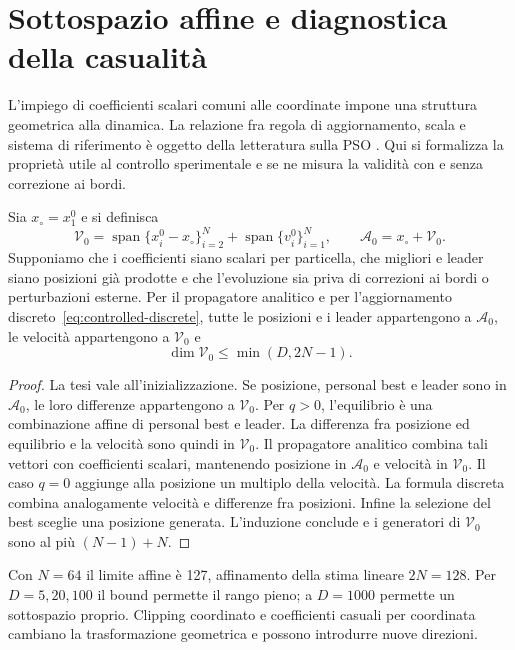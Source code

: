 \section{Sottospazio affine e diagnostica della casualità}\label{app:scalar-randomness}

L'impiego di coefficienti scalari comuni alle coordinate impone una struttura geometrica alla dinamica. La relazione fra regola di aggiornamento, scala e sistema di riferimento è oggetto della letteratura sulla PSO \citep{Wilke2007Invariance}. Qui si formalizza la proprietà utile al controllo sperimentale e se ne misura la validità con e senza correzione ai bordi.

\begin{proposition}
Sia $x_\circ=x_1^0$ e si definisca
\begin{equation}
 \mathcal V_0=\operatorname{span}\{x_i^0-x_\circ\}_{i=2}^N
 +\operatorname{span}\{v_i^0\}_{i=1}^N,\qquad
 \mathcal A_0=x_\circ+\mathcal V_0.
\end{equation}
Supponiamo che i coefficienti siano scalari per particella, che migliori e leader siano posizioni già prodotte e che l'evoluzione sia priva di correzioni ai bordi o perturbazioni esterne. Per il propagatore analitico e per l'aggiornamento discreto~\eqref{eq:controlled-discrete}, tutte le posizioni e i leader appartengono a $\mathcal A_0$, le velocità appartengono a $\mathcal V_0$ e
\begin{equation}
 \dim\mathcal V_0\le\min(D,2N-1).
\end{equation}
\end{proposition}
\begin{proof}
La tesi vale all'inizializzazione. Se posizione, personal best e leader sono in $\mathcal A_0$, le loro differenze appartengono a $\mathcal V_0$. Per $q>0$, l'equilibrio è una combinazione affine di personal best e leader. La differenza fra posizione ed equilibrio e la velocità sono quindi in $\mathcal V_0$. Il propagatore analitico combina tali vettori con coefficienti scalari, mantenendo posizione in $\mathcal A_0$ e velocità in $\mathcal V_0$. Il caso $q=0$ aggiunge alla posizione un multiplo della velocità. La formula discreta combina analogamente velocità e differenze fra posizioni. Infine la selezione del best sceglie una posizione generata. L'induzione conclude e i generatori di $\mathcal V_0$ sono al più $(N-1)+N$.
\end{proof}

Con $N=64$ il limite affine è 127, affinamento della stima lineare $2N=128$. Per $D=5,20,100$ il bound permette il rango pieno; a $D=1000$ permette un sottospazio proprio. Clipping coordinato e coefficienti casuali per coordinata cambiano la trasformazione geometrica e possono introdurre nuove direzioni.

